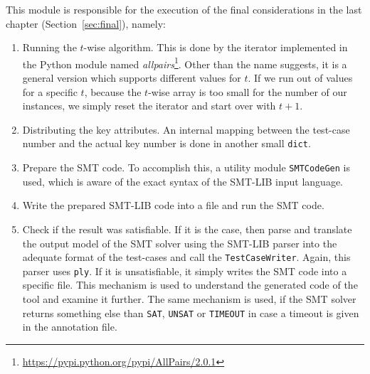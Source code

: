 This module is responsible for the execution of the final considerations in the last chapter (Section~\ref{sec:final}), namely:
\begin{enumerate}
 \item Running the $t$-wise algorithm. This is done by the iterator implemented in the Python module named \emph{allpairs}\footnote{\url{https://pypi.python.org/pypi/AllPairs/2.0.1}}. Other than the name suggests, it is a general version which supports different values for $t$. If we run out of values for a specific $t$, because the $t$-wise array is too small for the number of our instances, we simply reset the iterator and start over with $t+1$.
 
 \item Distributing the key attributes. An internal mapping between the test-case number and the actual key number is done in another small \verb|dict|.
 
 \item Prepare the SMT code. To accomplish this, a utility module \verb|SMTCodeGen| is used, which is aware of the exact syntax of the SMT-LIB input language.
 
 \item Write the prepared SMT-LIB code into a file and run the SMT code. 
 
 \item Check if the result was satisfiable. If it is the case, then parse and translate the output model of the SMT solver using the SMT-LIB parser into the adequate format of the test-cases and call the \verb|TestCaseWriter|. Again, this parser uses \verb|ply|. If it is unsatisfiable, it simply writes the SMT code into a specific file. This mechanism is used to understand the generated code of the tool and examine it further. The same mechanism is used, if the SMT solver returns something else than \verb|SAT|, \verb|UNSAT| or \verb|TIMEOUT| in case a timeout is given in the annotation file.
\end{enumerate}

